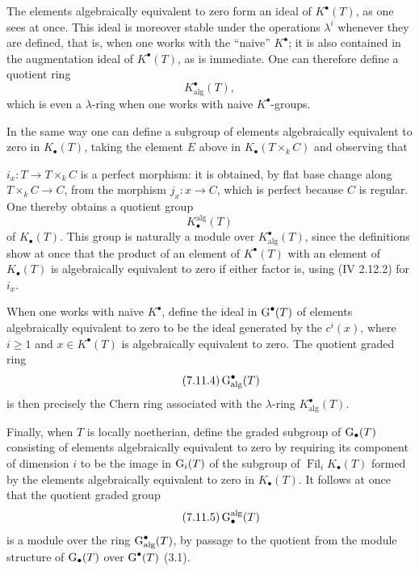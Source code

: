 The elements algebraically equivalent to zero form an ideal of
$K^\bullet(T)$, as one sees at once. This ideal is moreover stable under the
operations $\lambda^i$ whenever they are defined, that is, when one works
with the ``naive'' $K^\bullet$; it is also contained in the augmentation
ideal of $K^\bullet(T)$, as is immediate. One can therefore define a quotient
ring
\begin{equation}\tag{7.11.2}
K^\bullet_{\mathrm{alg}}(T),
\end{equation}
which is even a $\lambda$-ring when one works with naive $K^\bullet$-groups.

In the same way one can define a subgroup of elements algebraically
equivalent to zero in $K_\bullet(T)$, taking the element $E$ above in
$K_\bullet(T\times_k C)$ and observing that

$i_x:T\to T\times_k C$ is a perfect morphism: it is obtained, by flat base
change along $T\times_k C\to C$, from the morphism $j_x:x\to C$, which is
perfect because $C$ is regular. One thereby obtains a quotient group
\begin{equation}\tag{7.11.3}
K_\bullet^{\mathrm{alg}}(T)
\end{equation}
of $K_\bullet(T)$. This group is naturally a module over
$K^\bullet_{\mathrm{alg}}(T)$, since the definitions show at once that the
product of an element of $K^\bullet(T)$ with an element of $K_\bullet(T)$ is
algebraically equivalent to zero if either factor is, using (IV 2.12.2) for
$i_x$.

When one works with naive $K^\bullet$, define the ideal in $\operatorname{G}^\bullet(T)$
of elements algebraically equivalent to zero to be the ideal generated by the
$c^i(x)$, where $i\geq1$ and $x\in K^\bullet(T)$ is algebraically equivalent
to zero. The quotient graded ring
\begin{equation}\tag{7.11.4}
\operatorname{G}^\bullet_{\mathrm{alg}}(T)
\end{equation}
is then precisely the Chern ring associated with the $\lambda$-ring
$K^\bullet_{\mathrm{alg}}(T)$.

Finally, when $T$ is locally noetherian, define the graded subgroup of
$\operatorname{G}_\bullet(T)$ consisting of elements algebraically equivalent to zero by
requiring its component of dimension $i$ to be the image in $\operatorname{G}_i(T)$ of
the subgroup of $\operatorname{Fil}_iK_\bullet(T)$ formed by the elements algebraically
equivalent to zero in $K_\bullet(T)$. It follows at once that the quotient
graded group
\begin{equation}\tag{7.11.5}
\operatorname{G}_\bullet^{\mathrm{alg}}(T)
\end{equation}
is a module over the ring $\operatorname{G}^\bullet_{\mathrm{alg}}(T)$, by passage to the
quotient from the module structure of $\operatorname{G}_\bullet(T)$ over
$\operatorname{G}^\bullet(T)$ (3.1).

